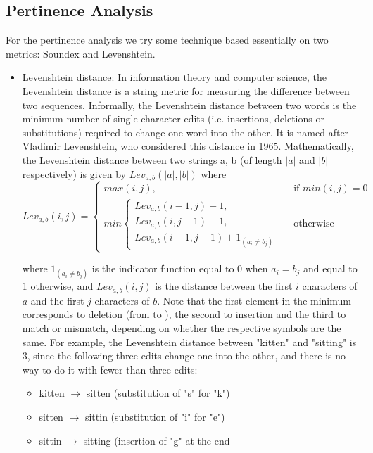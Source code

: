 \documentclass[conference, onecolumn]{IEEEtran}
\begin{document}
\subsection{Pertinence Analysis}
\medskip
For the pertinence analysis we try some technique based essentially on two metrics: Soundex and Levenshtein.
\begin{itemize}
	\item
	Levenshtein distance:
	In information theory and computer science, the Levenshtein distance is a string metric for measuring the difference between two sequences. Informally, the Levenshtein distance between two words is the minimum number of single-character edits (i.e. insertions, deletions or substitutions) required to change one word into the other. It is named after Vladimir Levenshtein, who considered this distance in 1965.
	Mathematically, the Levenshtein distance between two strings a, b (of length $|a|$ and $|b|$ respectively) is given by $ Lev_{a,b}(|a|,|b|)$ where
	$$Lev_{a,b}(i,j)=\begin{cases} max(i,j), & \mbox{if }min(i,j)=0 \\ min \begin{cases}	Lev_{a,b}(i-1,j)+1, & \\Lev_{a,b}(i,j-1)+1,&\\Lev_{a,b}(i-1,j-1)+1_{(a_i \ne b_j)} & \end{cases} & \mbox{otherwise }	\end{cases}$$
	
	where ${1_{(a_i \ne b_j)}}$ is the indicator function equal to 0 when ${a_i = b_j}$ and equal to 1 otherwise, and $Lev_{a,b}(i,j)$ is the distance between the first $i$ characters of $a$ and the first $j$ characters of $b$.
	Note that the first element in the minimum corresponds to deletion (from  to ), the second to insertion and the third to match or mismatch, depending on whether the respective symbols are the same.
	For example, the Levenshtein distance between "kitten" and "sitting" is 3, since the following three edits change one into the other, and there is no way to do it with fewer than three edits:
	\begin{itemize}
	\item kitten $\to$ sitten (substitution of "s" for "k")
	\item sitten $\to$ sittin (substitution of "i" for "e")
	\item sittin $\to$ sitting (insertion of "g" at the end
	\end{itemize}


\end{itemize}
\end{document}
